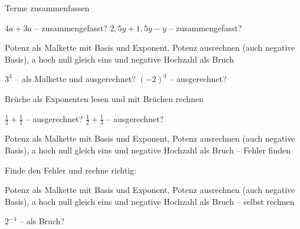 \begin{aufgabe}{Terme zusammenfassen}
\begin{teile}
\teil $4a + 3a$ – zusammengefasst? \leerfeld
\teil $2{,}5y + 1{,}5y - y$ – zusammengefasst? \leerfeld
\end{teile}
\end{aufgabe}

\begin{aufgabe}{Potenz als Malkette mit Basis und Exponent, Potenz ausrechnen (auch negative Basis), a hoch null gleich eins und negative Hochzahl als Bruch}
\begin{teile}
\teil $3^3$ – als Malkette und ausgerechnet? \leerfeld
\teil $(-2)^3$ – ausgerechnet? \leerfeld
\end{teile}
\end{aufgabe}

\begin{aufgabe}{Brüche als Exponenten lesen und mit Brüchen rechnen}
\begin{teile}
\teil $\frac{1}{2} + \frac{1}{2}$ – ausgerechnet? \leerfeld
\teil $\frac{1}{2} + \frac{1}{3}$ – ausgerechnet? \leerfeld
\end{teile}
\end{aufgabe}

\begin{aufgabe}{Potenz als Malkette mit Basis und Exponent, Potenz ausrechnen (auch negative Basis), a hoch null gleich eins und negative Hochzahl als Bruch – Fehler finden}
\begin{teile}
\teil Finde den Fehler und rechne richtig: 
\end{teile}
\end{aufgabe}

\begin{aufgabe}{Potenz als Malkette mit Basis und Exponent, Potenz ausrechnen (auch negative Basis), a hoch null gleich eins und negative Hochzahl als Bruch – selbst rechnen}
\begin{teile}
\teil $2^{-4}$ – als Bruch? \leerfeld
\end{teile}
\end{aufgabe}
